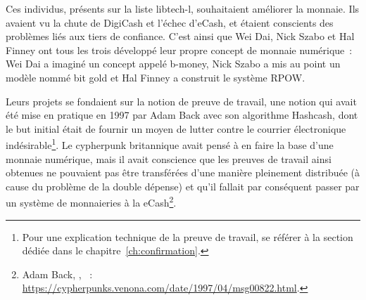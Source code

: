 Ces individus, présents sur la liste libtech-l, souhaitaient améliorer la monnaie. Ils avaient vu la chute de DigiCash et l'échec d'eCash, et étaient conscients des problèmes liés aux tiers de confiance. C'est ainsi que Wei Dai, Nick Szabo et Hal Finney ont tous les trois développé leur propre concept de monnaie numérique~: Wei Dai a imaginé un concept appelé b-money, Nick Szabo a mis au point un modèle nommé bit gold et Hal Finney a construit le système RPOW.

Leurs projets se fondaient sur la notion de preuve de travail, une notion qui avait été mise en pratique en 1997 par Adam Back avec son algorithme Hashcash, dont le but initial était de fournir un moyen de lutter contre le courrier électronique indésirable\footnote{Pour une explication technique de la preuve de travail, se référer à la section dédiée dans le chapitre~\ref{ch:confirmation}.}. Le cypherpunk britannique avait pensé à en faire la base d'une monnaie numérique, mais il avait conscience que les preuves de travail ainsi obtenues ne pouvaient pas être transférées d'une manière pleinement distribuée (à cause du problème de la double dépense) et qu'il fallait par conséquent passer par un système de monnaieries à la eCash\footnote{Adam Back, , ~: \url{https://cypherpunks.venona.com/date/1997/04/msg00822.html}.}. %
%

